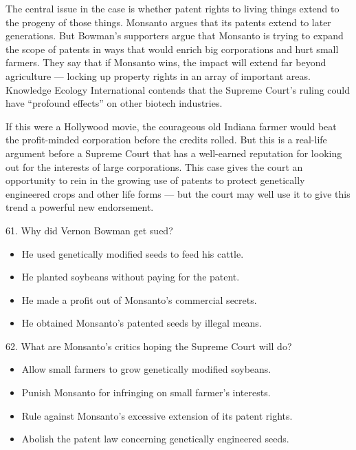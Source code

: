 \documentclass[UTF8,11pt]{ctexart}
\begin{document}
The central issue in the case is whether patent rights to living things extend to the progeny of those things. Monsanto argues that its patents extend to later generations. But Bowman’s supporters argue that Monsanto is trying to expand the scope of patents in ways that would enrich big corporations and hurt small farmers. They say that if Monsanto wins, the impact will extend far beyond agriculture — locking up property rights in an array of important areas. Knowledge Ecology International contends that the Supreme Court’s ruling could have “profound effects” on other biotech industries.


If this were a Hollywood movie, the courageous old Indiana farmer would beat the profit-minded corporation before the credits rolled. But this is a real-life argument before a Supreme Court that has a well-earned reputation for looking out for the interests of large corporations. This case gives the court an opportunity to rein in the growing use of patents to protect genetically engineered crops and other life forms — but the court may well use it to give this trend a powerful new endorsement.


61. Why did Vernon Bowman get sued?


\begin{itemize}[leftmargin=2em,itemsep=.2em,topsep=.4em]\item[A.] He used genetically modified seeds to feed his cattle.
\item[B.] He planted soybeans without paying for the patent.
\item[C.] He made a profit out of Monsanto’s commercial secrets.
\item[D.] He obtained Monsanto’s patented seeds by illegal means.
\end{itemize}

62. What are Monsanto’s critics hoping the Supreme Court will do?


\begin{itemize}[leftmargin=2em,itemsep=.2em,topsep=.4em]\item[A.] Allow small farmers to grow genetically modified soybeans.
\item[B.] Punish Monsanto for infringing on small farmer’s interests.
\item[C.] Rule against Monsanto’s excessive extension of its patent rights.
\item[D.] Abolish the patent law concerning genetically engineered seeds.
\end{itemize}
\end{document}
